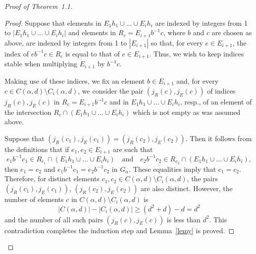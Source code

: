 \documentclass[10pt, reqno]{amsart}
\numberwithin{equation}{section}
\begin{document}
\begin{proof}[Proof of Theorem~1.1]
\begin{proof}
Suppose that elements in $E_1 h_1 \cup \dots \cup E_i h_i$ are indexed by integers from 1 to $|E_1 h_1 \cup \dots \cup E_i h_i|$ and elements in  $R_c = E_{i+1} b^{-1} c$, where $b$ and $c$ are chosen as above,  are indexed by integers from 1 to $|E_{i+1}|$ so that, for every $e \in E_{i+1}$,  the index of $e  b^{-1} c \in R_c$ is equal to that of $e \in E_{i+1}$. Thus, we wish to keep indices stable when multiplying $E_{i+1}$ by  $b^{-1} c$.

Making use of these indices, we fix an element $b \in E_{i+1}$ and, for every $c \in C({\alpha}, d) \setminus C_i({\alpha}, d)$, we consider the pair $( j_R(c),  j_E(c))$ of indices  $j_R(c),  j_E(c)$  in $R_c = E_{i+1} b^{-1} c$  and in  $E_1 h_1 \cup \dots \cup E_i h_i$, resp., of an element of the intersection $R_c  \cap (E_1 h_1 \cup \dots \cup E_i h_i)$ which is not empty as was assumed above.

Suppose that  $( j_R(c_1),  j_E(c_1)) =  ( j_R(c_2),  j_E(c_2))$. Then it follows from the definitions that if $e_1, e_2 \in  E_{i+1}$ are such that
$$
e_1 b^{-1} c_1 \in R_{c_1} \cap (E_1 h_1 \cup \dots \cup E_i h_i) \quad \mbox{and}   \quad e_2 b^{-1} c_2 \in R_{c_2}\cap (E_1 h_1 \cup \dots \cup E_i h_i) ,
$$
then $e_1 = e_2$ and $e_1 b^{-1} c_1 = e_2 b^{-1} c_2$ in $G_{\alpha}$. These equalities imply that $c_1 = c_2$. Therefore,  for distinct elements $c_1, c_2 \in C({\alpha}, d) \setminus C_i({\alpha}, d)$, the pairs $(j_R(c_1),  j_E(c_1))$, $(j_R(c_2),  j_E(c_2))$ are also distinct. However, the number of elements $c$ in   $C({\alpha}, d) \setminus C_i({\alpha}, d)$ is
$$
|C({\alpha}, d)|- | C_i({\alpha}, d)| \ge (d^2 +d)-d = d^2
$$
and the number of all such pairs  $(j_R(c),  j_E(c))$  is less than $d^2$. This contradiction completes the induction step and Lemma~\ref{lemy} is proved.
\end{proof}


\end{proof}
\end{document}
